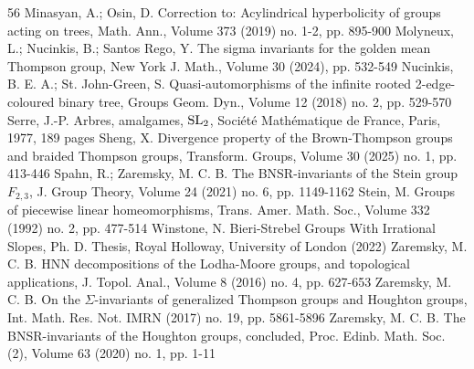 \documentclass[10pt,a4paper]{article}
\theoremstyle{definition}
\theoremstyle{remark}
\theoremstyle{plain}
\begin{document}
\begin{thebibliography}{56}
Minasyan, A.; Osin, D. Correction to: Acylindrical hyperbolicity of groups acting on trees, Math. Ann., Volume 373 (2019) no. 1-2, pp. 895-900
Molyneux, L.; Nucinkis, B.; Santos Rego, Y. The sigma invariants for the golden mean Thompson group, New York J. Math., Volume 30 (2024), pp. 532-549
Nucinkis, B. E. A.; St. John-Green, S. Quasi-automorphisms of the infinite rooted 2-edge-coloured binary tree, Groups Geom. Dyn., Volume 12 (2018) no. 2, pp. 529-570
Serre, J.-P. Arbres, amalgames, ${\rm {SL}}_{2}$, Société Mathématique de France, Paris, 1977, 189 pages
Sheng, X. Divergence property of the Brown-Thompson groups and braided Thompson groups, Transform. Groups, Volume 30 (2025) no. 1, pp. 413-446
Spahn, R.; Zaremsky, M. C. B. The BNSR-invariants of the Stein group ${F}_{2,3}$, J. Group Theory, Volume 24 (2021) no. 6, pp. 1149-1162
Stein, M. Groups of piecewise linear homeomorphisms, Trans. Amer. Math. Soc., Volume 332 (1992) no. 2, pp. 477-514
Winstone, N. Bieri-Strebel Groups With Irrational Slopes, Ph. D. Thesis, Royal Holloway, University of London (2022)
Zaremsky, M. C. B. HNN decompositions of the Lodha-Moore groups, and topological applications, J. Topol. Anal., Volume 8 (2016) no. 4, pp. 627-653
Zaremsky, M. C. B. On the $\Sigma $-invariants of generalized Thompson groups and Houghton groups, Int. Math. Res. Not. IMRN (2017) no. 19, pp. 5861-5896
Zaremsky, M. C. B. The BNSR-invariants of the Houghton groups, concluded, Proc. Edinb. Math. Soc. (2), Volume 63 (2020) no. 1, pp. 1-11
\end{thebibliography}
\end{document}
